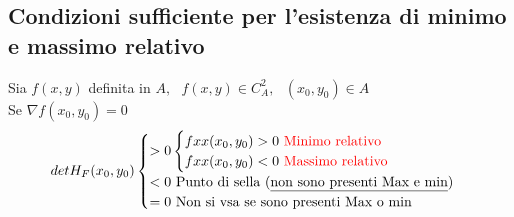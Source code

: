 \subsection{Condizioni sufficiente per l'esistenza di minimo e massimo relativo}
Sia $f(x,y)$ definita in $A,\text{ } f(x,y)\in C^2_A, \text{ } (x_0,y_0)\in A$\\
Se $\nabla f(x_0,y_0)=0$
\begin{equation*}
  det H_F(x_0,y_0)\begin{cases}
                    >0 \begin{cases}
                         fxx(x_0,y_0)>0 \text{ \color{red} Minimo relativo}\\
                         fxx(x_0,y_0)<0 \text{ \color{red} Massimo relativo}
                       \end{cases}\\
                    <0 \text{ Punto di sella (\underline{non sono presenti Max e min})}\\
                    =0 \text{ Non si vsa se sono presenti Max o min}
                  \end{cases}
\end{equation*}
